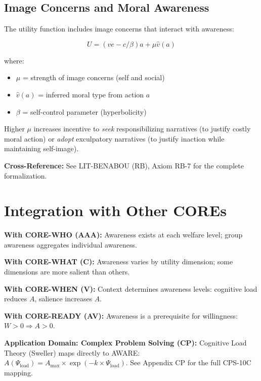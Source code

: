 \subsection{Image Concerns and Moral Awareness}

The utility function includes image concerns that interact with awareness:

\begin{equation}
U = (ve - c/\beta)a + \mu \hat{v}(a)
\end{equation}

where:
\begin{itemize}[nosep]
\item $\mu$ = strength of image concerns (self and social)
\item $\hat{v}(a)$ = inferred moral type from action $a$
\item $\beta$ = self-control parameter (hyperbolicity)
\end{itemize}

Higher $\mu$ increases incentive to \textit{seek} responsibilizing narratives (to justify costly moral action) or \textit{adopt} exculpatory narratives (to justify inaction while maintaining self-image).

\textbf{Cross-Reference:} See LIT-BENABOU (RB), Axiom RB-7 for the complete formalization.

\section{Integration with Other COREs}

\begin{tcolorbox}[colback=yellow!5!white, colframe=yellow!75!black,
    title=Integration: CORE-AWARE $\leftrightarrow$ Other COREs]
\textbf{With CORE-WHO (AAA):}
Awareness exists at each welfare level; group awareness aggregates individual awareness.

\textbf{With CORE-WHAT (C):}
Awareness varies by utility dimension; some dimensions are more salient than others.

\textbf{With CORE-WHEN (V):}
Context determines awareness levels: cognitive load reduces $A$, salience increases $A$.

\textbf{With CORE-READY (AV):}
Awareness is a prerequisite for willingness: $W > 0 \Rightarrow A > 0$.

\textbf{Application Domain: Complex Problem Solving (CP):}
Cognitive Load Theory (Sweller) maps directly to AWARE: $A(\Psi_{\text{load}}) = A_{\max} \times \exp(-k \times \Psi_{\text{load}})$. See Appendix CP for the full CPS-10C mapping.
\end{tcolorbox}

